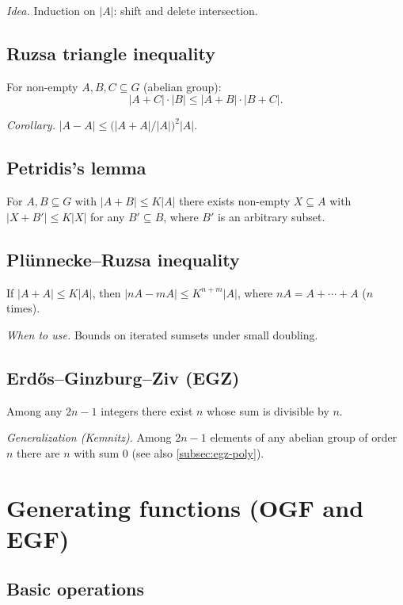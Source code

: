 \textit{Idea.} Induction on $|A|$: shift and delete intersection.

\subsection{Ruzsa triangle inequality}
\label{subsec:ruzsa-triangle}

For non-empty $A,B,C\subseteq G$ (abelian group):
$$|A+C|\cdot|B|\le|A+B|\cdot|B+C|.$$

\textit{Corollary.} $|A-A|\le\bigl(|A+A|/|A|\bigr)^2|A|$.

\subsection{Petridis's lemma}
\label{subsec:petridis}

For $A,B\subseteq G$ with $|A+B|\le K|A|$ there exists non-empty $X\subseteq A$ with $|X+B'|\le K|X|$ for any $B'\subseteq B$, where $B'$ is an arbitrary subset.

\subsection{Pl\"unnecke--Ruzsa inequality}
\label{subsec:plunnecke-ruzsa}

If $|A+A|\le K|A|$, then $|nA-mA|\le K^{n+m}|A|$, where $nA = A+\cdots+A$ ($n$ times).

\textit{When to use.} Bounds on iterated sumsets under small doubling.

\subsection{Erd\H{o}s--Ginzburg--Ziv (EGZ)}
\label{subsec:egz-combinatorics}

Among any $2n-1$ integers there exist $n$ whose sum is divisible by $n$.

\textit{Generalization (Kemnitz).} Among $2n-1$ elements of any abelian group of order $n$ there are $n$ with sum $0$ (see also \ref{subsec:egz-poly}).

\medskip

\section{Generating functions (OGF and EGF)}
\label{sec:generating-functions}

\subsection{Basic operations}
\label{subsec:gf-basic}

